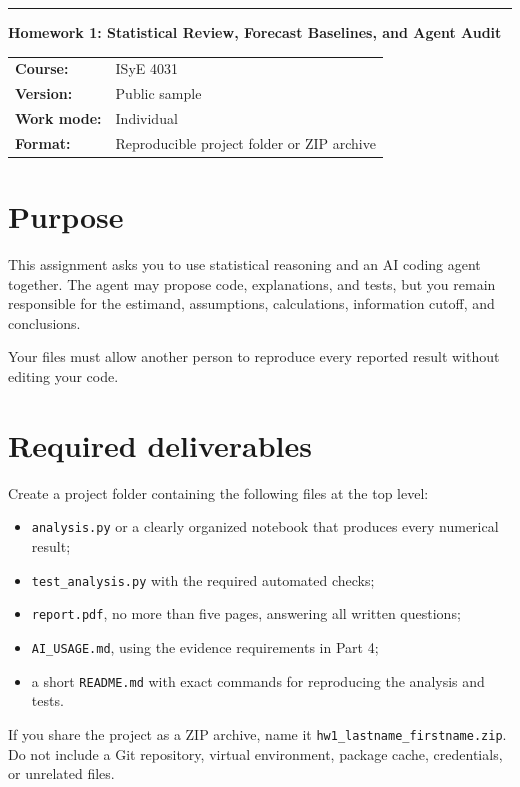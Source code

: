 \documentclass[11pt]{article}
\begin{document}
{\color{GTGold}\rule{\textwidth}{3pt}}
\vspace{0.5em}

{\LARGE\bfseries\color{GTNavy}Homework 1: Statistical Review, Forecast Baselines, and Agent Audit}

\vspace{0.4em}
\begin{tabular}{@{}ll@{}}
\textbf{Course:} & ISyE 4031 \\
\textbf{Version:} & Public sample \\
\textbf{Work mode:} & Individual \\
\textbf{Format:} & Reproducible project folder or ZIP archive
\end{tabular}

\section*{Purpose}

This assignment asks you to use statistical reasoning and an AI coding agent together. The agent may propose code, explanations, and tests, but you remain responsible for the estimand, assumptions, calculations, information cutoff, and conclusions.

Your files must allow another person to reproduce every reported result without editing your code.

\section*{Required deliverables}

Create a project folder containing the following files at the top level:
\begin{itemize}
  \item \texttt{analysis.py} or a clearly organized notebook that produces every numerical result;
  \item \texttt{test\_analysis.py} with the required automated checks;
  \item \texttt{report.pdf}, no more than five pages, answering all written questions;
  \item \texttt{AI\_USAGE.md}, using the evidence requirements in Part 4;
  \item a short \texttt{README.md} with exact commands for reproducing the analysis and tests.
\end{itemize}

If you share the project as a ZIP archive, name it \texttt{hw1\_lastname\_firstname.zip}. Do not include a Git repository, virtual environment, package cache, credentials, or unrelated files.
\end{document}
